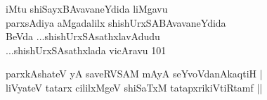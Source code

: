 \begin{entry}
\begin{shl}
iMtu shiSayxBAvavaneYdida liMgavu\\
parxsAdiya aMgadalilx shishUrxSABAvavaneYdida\\
BeVda ...shishUrxSAsathxlavAdudu\\
...shishUrxSAsathxlada vicAravu 101
\end{shl}
\end{entry}

\begin{entry}
\begin{shl}
parxkAshateV yA saveRVSAM mAyA seYvoVdanAkaqtiH |\\
liVyateV tatarx cililxMgeV shiSaTxM tatapxrikiVtiRtamf ||
\end{shl}
\end{entry}

